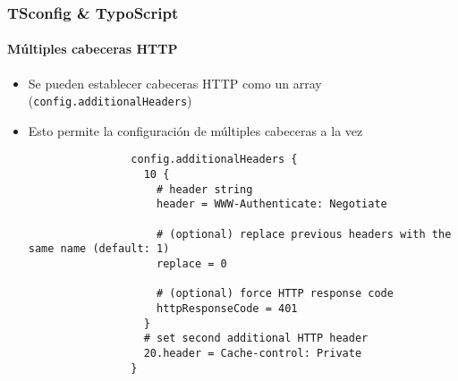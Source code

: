 
\begin{frame}[fragile]
	\frametitle{TSconfig \& TypoScript}
	\framesubtitle{Múltiples cabeceras HTTP}

	\begin{itemize}

		\item Se pueden establecer cabeceras HTTP como un array (\small\texttt{config.additionalHeaders}\normalsize)
		\item Esto permite la configuración de múltiples cabeceras a la vez

			\begin{lstlisting}
				config.additionalHeaders {
				  10 {
				    # header string
				    header = WWW-Authenticate: Negotiate

				    # (optional) replace previous headers with the same name (default: 1)
				    replace = 0

				    # (optional) force HTTP response code
				    httpResponseCode = 401
				  }
				  # set second additional HTTP header
				  20.header = Cache-control: Private
				}
			\end{lstlisting}

	\end{itemize}

\end{frame}


